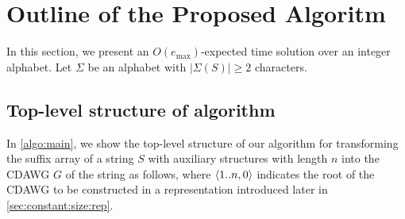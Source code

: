 \documentclass{article}
\begin{document}




\section{Outline of the Proposed Algoritm}

In this section, we present an $O(e_{\max})$-expected time solution over an integer alphabet.
Let $\Sigma$ be an alphabet with $|\Sigma(S)| \ge 2$ characters. 

\subsection{Top-level structure of algorithm}
In \cref{algo:main}, we show the top-level structure of our algorithm for transforming the suffix array of a string $S$ with auxiliary structures with length $n$ into the CDAWG $G$ of the string as follows, where $\langle 1..n, 0\rangle$ indicates the root of the CDAWG to be constructed in a representation introduced later in \cref{sec:constant:size:rep}. 
{
\setlength{\algotitleheightrule}{0pt}%
\begin{algorithm}[h]
  \caption{Transforming $SA$ and $S$ into its CDAWG $G$.
  }\label{algo:main}
\end{algorithm}
}
\end{document}
